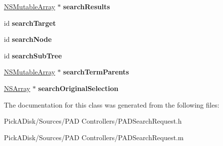 \begin{DoxyCompactItemize}
\item 
\hypertarget{interface_p_a_d_search_request_acb2c5ea10d1ff13bdf1e505d7d103ad2}{
\hyperlink{class_n_s_mutable_array}{NSMutableArray} $\ast$ {\bfseries searchResults}}
\label{interface_p_a_d_search_request_acb2c5ea10d1ff13bdf1e505d7d103ad2}

\item 
\hypertarget{interface_p_a_d_search_request_a8524a233e7befcec2c3d5709fa36baab}{
id {\bfseries searchTarget}}
\label{interface_p_a_d_search_request_a8524a233e7befcec2c3d5709fa36baab}

\item 
\hypertarget{interface_p_a_d_search_request_aeafcd3e89dad2c10c12f99fd2862977f}{
id {\bfseries searchNode}}
\label{interface_p_a_d_search_request_aeafcd3e89dad2c10c12f99fd2862977f}

\item 
\hypertarget{interface_p_a_d_search_request_a167460e248ddc1a75bac9eb1c37d5030}{
id {\bfseries searchSubTree}}
\label{interface_p_a_d_search_request_a167460e248ddc1a75bac9eb1c37d5030}

\item 
\hypertarget{interface_p_a_d_search_request_ab2fa649737e0aff3724812b1060ca17f}{
\hyperlink{class_n_s_mutable_array}{NSMutableArray} $\ast$ {\bfseries searchTermParents}}
\label{interface_p_a_d_search_request_ab2fa649737e0aff3724812b1060ca17f}

\item 
\hypertarget{interface_p_a_d_search_request_a221223d0f3608fee3829ef3a8c3812c8}{
\hyperlink{class_n_s_array}{NSArray} $\ast$ {\bfseries searchOriginalSelection}}
\label{interface_p_a_d_search_request_a221223d0f3608fee3829ef3a8c3812c8}

\end{DoxyCompactItemize}


The documentation for this class was generated from the following files:\begin{DoxyCompactItemize}
\item 
PickADisk/Sources/PAD Controllers/PADSearchRequest.h\item 
PickADisk/Sources/PAD Controllers/PADSearchRequest.m\end{DoxyCompactItemize}
